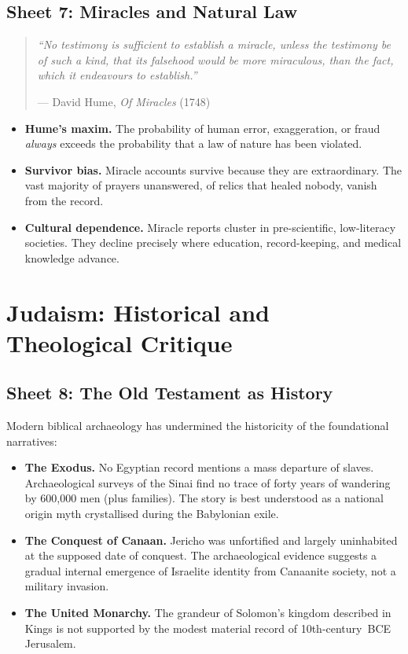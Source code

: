 \subsection{Sheet 7: Miracles and Natural Law}

\begin{quote}
\textit{``No testimony is sufficient to establish a miracle, unless the
testimony be of such a kind, that its falsehood would be more miraculous,
than the fact, which it endeavours to establish.''}

\medskip
\hfill--- David Hume, \textit{Of Miracles} (1748)
\end{quote}

\begin{itemize}
  \item \textbf{Hume's maxim.}
    The probability of human error, exaggeration, or fraud \emph{always}
    exceeds the probability that a law of nature has been violated.
  \item \textbf{Survivor bias.}
    Miracle accounts survive because they are extraordinary.  The vast
    majority of prayers unanswered, of relics that healed nobody, vanish
    from the record.
  \item \textbf{Cultural dependence.}
    Miracle reports cluster in pre-scientific, low-literacy societies.
    They decline precisely where education, record-keeping, and medical
    knowledge advance.
\end{itemize}

\section{Judaism: Historical and Theological Critique}

\subsection{Sheet 8: The Old Testament as History}

Modern biblical archaeology has
undermined the historicity of the foundational narratives:

\begin{itemize}
  \item \textbf{The Exodus.}
    No Egyptian record mentions a mass departure of slaves.
    Archaeological surveys of the Sinai find no trace of forty years of
    wandering by 600,000 men (plus families).  The story is best understood
    as a national origin myth crystallised during the Babylonian
    exile.
  \item \textbf{The Conquest of Canaan.}
    Jericho was unfortified and largely uninhabited at the
    supposed date of conquest.  The archaeological evidence suggests a gradual
    internal emergence of Israelite identity from Canaanite
    society, not a military invasion.
  \item \textbf{The United Monarchy.}
    The grandeur of Solomon's kingdom described in Kings is
    not supported by the modest material record of 10th-century~BCE
    Jerusalem.
\end{itemize}

